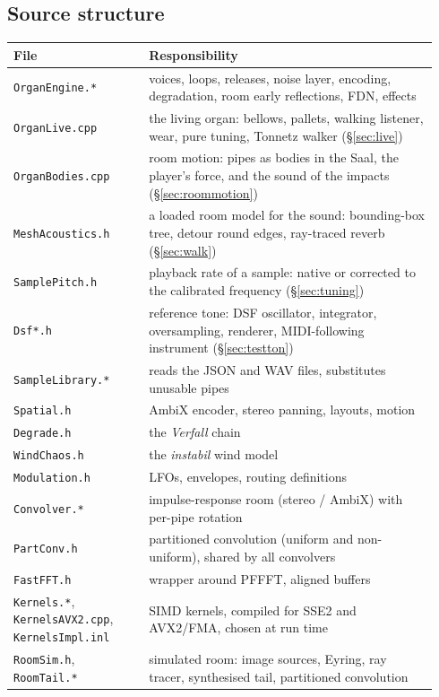 \documentclass[11pt,a4paper,parskip=half,DIV=11,toc=bibliography]{scrartcl}
\newcommand{\ui}[1]{\emph{#1}}                 %
\newcommand{\fn}[1]{\mbox{\texttt{#1}}}
\begin{document}
\subsection{Source structure}
{\footnotesize
\begin{longtable}{@{}p{0.3\linewidth}p{0.64\linewidth}@{}}
\toprule
File & Responsibility \\
\midrule
\endhead
\fn{OrganEngine.*}     & voices, loops, releases, noise layer, encoding, degradation, room early reflections, FDN, effects \\
\fn{OrganLive.cpp}     & the living organ: bellows, pallets, walking listener, wear, pure tuning, Tonnetz walker (\S\ref{sec:live}) \\
\fn{OrganBodies.cpp}   & room motion: pipes as bodies in the Saal, the player's force, and the sound of the impacts (\S\ref{sec:roommotion}) \\
\fn{MeshAcoustics.h}   & a loaded room model for the sound: bounding-box tree, detour round edges, ray-traced reverb (\S\ref{sec:walk}) \\
\fn{SamplePitch.h}     & playback rate of a sample: native or corrected to the calibrated frequency (\S\ref{sec:tuning}) \\
\fn{Dsf*.h}            & reference tone: DSF oscillator, integrator, oversampling, renderer, MIDI-following instrument (\S\ref{sec:testton}) \\
\fn{SampleLibrary.*}   & reads the JSON and WAV files, substitutes unusable pipes \\
\fn{Spatial.h}         & AmbiX encoder, stereo panning, layouts, motion \\
\fn{Degrade.h}         & the \ui{Verfall} chain \\
\fn{WindChaos.h}       & the \ui{instabil} wind model \\
\fn{Modulation.h}      & LFOs, envelopes, routing definitions \\
\fn{Convolver.*}       & impulse-response room (stereo / AmbiX) with per-pipe rotation \\
\fn{PartConv.h}        & partitioned convolution (uniform and non-uniform), shared by all convolvers \\
\fn{FastFFT.h}         & wrapper around PFFFT, aligned buffers \\
\fn{Kernels.*}, \fn{KernelsAVX2.cpp}, \fn{KernelsImpl.inl} & SIMD kernels, compiled for SSE2 and AVX2/FMA, chosen at run time \\
\fn{RoomSim.h}, \fn{RoomTail.*} & simulated room: image sources, Eyring, ray tracer, synthesised tail, partitioned convolution \\

\end{longtable}}
\end{document}
